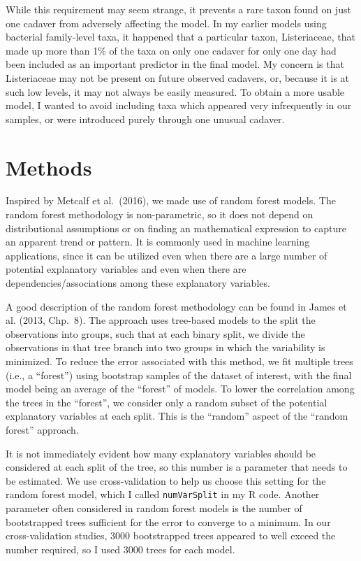 \documentclass{article}
\begin{document}
While this requirement may seem strange, it prevents a rare taxon
found on just one cadaver from adversely affecting the model.  In my
earlier models using bacterial family-level taxa, it happened that a
particular taxon, Listeriaceae, that made up more than 1\% of the taxa
on only one cadaver for only one day had been included as an important
predictor in the final model.  My concern is that Listeriaceae may not
be present on future observed cadavers, or, because it is at such low
levels, it may not always be easily measured.  To obtain a more usable
model, I wanted to avoid including taxa which appeared very
infrequently in our samples, or were introduced purely through one
unusual cadaver.


\section{Methods}

Inspired by Metcalf et al.~(2016), we made use of random forest
models.  The random forest methodology is non-parametric, so it does
not depend on distributional assumptions or on finding an mathematical
expression to capture an apparent trend or pattern.  It is commonly
used in machine learning applications, since it can be utilized even
when there are a large number of potential explanatory variables and
even when there are dependencies/associations among these explanatory
variables.

A good description of the random forest methodology can be found in
James et al. (2013, Chp.~8).  The approach uses tree-based models to
the split the observations into groups, such that at each binary
split, we divide the observations in that tree branch into two groups
in which the variability is minimized.  To reduce the error
associated with this method, we fit multiple trees (i.e., a
``forest'') using bootstrap samples of the dataset of interest, with
the final model being an average of the ``forest'' of models.  To
lower the correlation among the trees in the ``forest'', we consider
only a random subset of the potential explanatory variables at each
split.  This is the ``random'' aspect of the ``random forest'' approach.

It is not immediately evident how many explanatory variables should be
considered at each split of the tree, so this number is a parameter
that needs to be estimated.  We use cross-validation to help us choose
this setting for the random forest model, which I called
\texttt{numVarSplit} in my R code.  Another parameter often considered
in random forest models is the number of bootstrapped trees sufficient
for the error to converge to a minimum.  In our cross-validation
studies, 3000 bootstrapped trees appeared to well exceed the number
required, so I used 3000 trees for each model.
\end{document}
